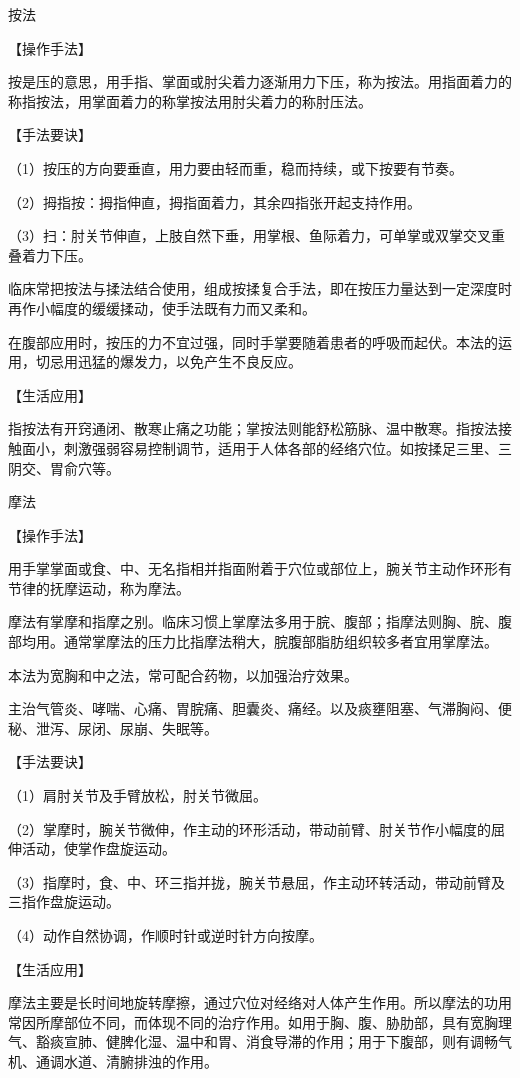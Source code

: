 \documentclass[12pt,UTF8]{ctexbook}
\begin{document}
按法

【操作手法】

按是压的意思，用手指、掌面或肘尖着力逐渐用力下压，称为按法。用指面着力的称指按法，用掌面着力的称掌按法用肘尖着力的称肘压法。

【手法要诀】

（1）按压的方向要垂直，用力要由轻而重，稳而持续，或下按要有节奏。

（2）拇指按：拇指伸直，拇指面着力，其余四指张开起支持作用。

（3）扫：肘关节伸直，上肢自然下垂，用掌根、鱼际着力，可单掌或双掌交叉重叠着力下压。

临床常把按法与揉法结合使用，组成按揉复合手法，即在按压力量达到一定深度时再作小幅度的缓缓揉动，使手法既有力而又柔和。

在腹部应用时，按压的力不宜过强，同时手掌要随着患者的呼吸而起伏。本法的运用，切忌用迅猛的爆发力，以免产生不良反应。

【生活应用】

指按法有开窍通闭、散寒止痛之功能；掌按法则能舒松筋脉、温中散寒。指按法接触面小，刺激强弱容易控制调节，适用于人体各部的经络穴位。如按揉足三里、三阴交、胃俞穴等。

摩法

【操作手法】

用手掌掌面或食、中、无名指相并指面附着于穴位或部位上，腕关节主动作环形有节律的抚摩运动，称为摩法。

摩法有掌摩和指摩之别。临床习惯上掌摩法多用于脘、腹部；指摩法则胸、脘、腹部均用。通常掌摩法的压力比指摩法稍大，脘腹部脂肪组织较多者宜用掌摩法。

本法为宽胸和中之法，常可配合药物，以加强治疗效果。

主治气管炎、哮喘、心痛、胃脘痛、胆囊炎、痛经。以及痰壅阻塞、气滞胸闷、便秘、泄泻、尿闭、尿崩、失眠等。

【手法要诀】

（1）肩肘关节及手臂放松，肘关节微屈。

（2）掌摩时，腕关节微伸，作主动的环形活动，带动前臂、肘关节作小幅度的屈伸活动，使掌作盘旋运动。

（3）指摩时，食、中、环三指并拢，腕关节悬屈，作主动环转活动，带动前臂及三指作盘旋运动。

（4）动作自然协调，作顺时针或逆时针方向按摩。

【生活应用】

摩法主要是长时间地旋转摩擦，通过穴位对经络对人体产生作用。所以摩法的功用常因所摩部位不同，而体现不同的治疗作用。如用于胸、腹、胁肋部，具有宽胸理气、豁痰宣肺、健脾化湿、温中和胃、消食导滞的作用；用于下腹部，则有调畅气机、通调水道、清腑排浊的作用。
\end{document}
